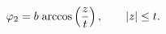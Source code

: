 \begin{equation}
  \label{eq:sol_zlt}
  \varphi_2= b \; \hbox{arccos}\left(\frac{z}{t}\right), \qquad{|z|
  \leq t} .
\end{equation}

